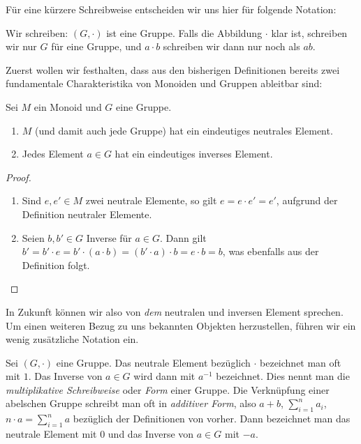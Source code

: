 {Für eine kürzere Schreibweise entscheiden wir uns hier für folgende Notation:

\begin{notation}
  Wir schreiben: $(G,\cdot)$ ist eine Gruppe. Falls die Abbildung $\cdot$ klar ist, schreiben wir nur $G$ für eine Gruppe, und $a \cdot b$ schreiben wir dann nur noch als $ab$.
\end{notation}

Zuerst wollen wir festhalten, dass aus den bisherigen Definitionen bereits zwei fundamentale Charakteristika von Monoiden und Gruppen ableitbar sind:

\begin{proposition}
  Sei $M$ ein Monoid und $G$ eine Gruppe.
  \begin{enumerate}
    \item $M$ (und damit auch jede Gruppe) hat ein eindeutiges neutrales Element.
    \item Jedes Element $a \in G$ hat ein eindeutiges inverses Element.
  \end{enumerate}
\end{proposition}

\begin{proof}
  \begin{enumerate}
    \item Sind $e,e' \in M$ zwei neutrale Elemente, so gilt $e = e \cdot e' = e'$, aufgrund der Definition neutraler Elemente.
    \item Seien $b,b' \in G$ Inverse für $a \in G$. Dann gilt $b' = b' \cdot e = b' \cdot (a \cdot b) = (b' \cdot a) \cdot b = e \cdot b = b$, was ebenfalls aus der Definition folgt.
  \end{enumerate}
\end{proof}

In Zukunft können wir also von \textit{dem} neutralen und inversen Element sprechen. Um einen weiteren Bezug zu uns bekannten Objekten herzustellen, führen wir ein wenig zusätzliche Notation ein.

\begin{notation}
Sei $(G,\cdot)$ eine Gruppe. Das neutrale Element bezüglich $\cdot$ bezeichnet man oft mit $1$. Das Inverse von $a \in G$ wird dann mit $a^{-1}$ bezeichnet. Dies nennt man die \emph{multiplikative Schreibweise} oder \emph{Form} einer Gruppe.
Die Verknüpfung einer abelschen Gruppe schreibt man oft in \emph{additiver Form}, also $a+b$, $\sum_{i=1}^n a_i$, $n \cdot a = \sum_{i=1}^n a$ bezüglich der Definitionen von vorher. Dann bezeichnet man das neutrale Element mit $0$ und das Inverse von $a \in G$ mit $-a$.
\end{notation}

}
